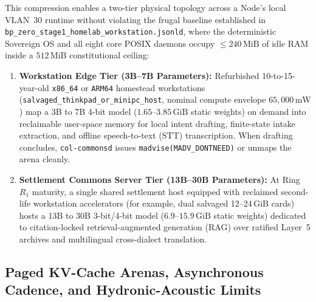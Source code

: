 This compression enables a two-tier physical topology across a Node's local VLAN~30 runtime without violating the frugal baseline established in \texttt{bp\_zero\_stage1\_homelab\_workstation.jsonld}, where the deterministic Sovereign OS and all eight core POSIX daemons occupy $\le 240\,\mathrm{MiB}$ of idle RAM inside a $512\,\mathrm{MiB}$ constitutional ceiling:
\begin{enumerate}
  \item \textbf{Workstation Edge Tier (3B--7B Parameters):} Refurbished 10-to-15-year-old \texttt{x86\_64} or \texttt{ARM64} homestead workstations (\texttt{salvaged\_thinkpad\_or\_minipc\_host}, nominal compute envelope $65{,}000\,\mathrm{mW}$) map a 3B to 7B 4-bit model ($1.65$--$3.85\,\mathrm{GiB}$ static weights) on demand into reclaimable user-space memory for local intent drafting, finite-state intake extraction, and offline speech-to-text (STT) transcription. When drafting concludes, \texttt{col-commonsd} issues \texttt{madvise(MADV\_DONTNEED)} or unmaps the arena cleanly.
  \item \textbf{Settlement Commons Server Tier (13B--30B Parameters):} At Ring~$R_1$ maturity, a single shared settlement host equipped with reclaimed second-life workstation accelerators (for example, dual salvaged 12--24\,\textrm{GiB} cards) hosts a 13B to 30B 3-bit/4-bit model ($6.9$--$15.9\,\mathrm{GiB}$ static weights) dedicated to citation-locked retrieval-augmented generation (RAG) over ratified Layer~5 archives and multilingual cross-dialect translation.
\end{enumerate}

\subsection{Paged KV-Cache Arenas, Asynchronous Cadence, and Hydronic-Acoustic Limits}
\label{subsec:kv-cache-acoustics}

